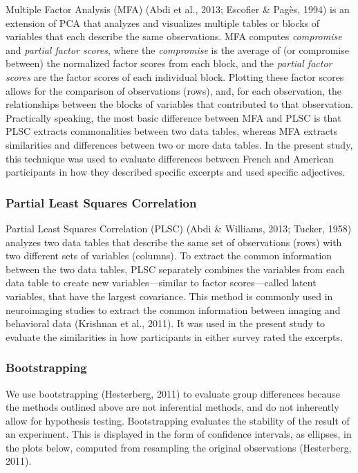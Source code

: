 \documentclass[
  english,
  man,floatsintext]{apa6}
\begin{document}
Multiple Factor Analysis (MFA) (Abdi et al., 2013; Escofier \& Pagès, 1994) is an extension of PCA that analyzes and visualizes multiple tables or blocks of variables that each describe the same observations. MFA computes \emph{compromise} and \emph{partial factor scores}, where the \emph{compromise} is the average of (or compromise between) the normalized factor scores from each block, and the \emph{partial factor scores} are the factor scores of each individual block. Plotting these factor scores allows for the comparison of observations (rows), and, for each observation, the relationships between the blocks of variables that contributed to that observation. Practically speaking, the most basic difference between MFA and PLSC is that PLSC extracts commonalities between two data tables, whereas MFA extracts similarities and differences between two or more data tables. In the present study, this technique was used to evaluate differences between French and American participants in how they described specific excerpts and used specific adjectives.

\hypertarget{partial-least-squares-correlation}{%
\subsubsection{Partial Least Squares Correlation}\label{partial-least-squares-correlation}}

Partial Least Squares Correlation (PLSC) (Abdi \& Williams, 2013; Tucker, 1958) analyzes two data tables that describe the same set of observations (rows) with two different sets of variables (columns). To extract the common information between the two data tables, PLSC separately combines the variables from each data table to create new variables---similar to factor scores---called latent variables, that have the largest covariance. This method is commonly used in neuroimaging studies to extract the common information between imaging and behavioral data (Krishnan et al., 2011). It was used in the present study to evaluate the similarities in how participants in either survey rated the excerpts.

\hypertarget{bootstrapping}{%
\subsubsection{Bootstrapping}\label{bootstrapping}}

We use bootstrapping (Hesterberg, 2011) to evaluate group differences because the methods outlined above are not inferential methods, and do not inherently allow for hypothesis testing. Bootstrapping evaluates the stability of the result of an experiment. This is displayed in the form of confidence intervals, as ellipses, in the plots below, computed from resampling the original observations (Hesterberg, 2011).
\end{document}

